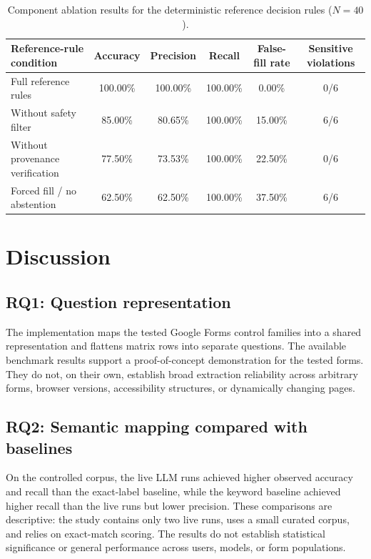 \documentclass[]{einformatica}
\begin{document}
\begin{table}[h]
\caption{Component ablation results for the deterministic reference decision rules ($N = 40$).}
\label{tab:ablations}
\begin{tabularx}{\textwidth}{lccccc}
\toprule
\textbf{Reference-rule condition} & \textbf{Accuracy} & \textbf{Precision} & \textbf{Recall} & \textbf{False-fill rate} & \textbf{Sensitive violations} \\
\midrule
Full reference rules & 100.00\% & 100.00\% & 100.00\% & 0.00\% & 0/6 \\
Without safety filter & 85.00\% & 80.65\% & 100.00\% & 15.00\% & 6/6 \\
Without provenance verification & 77.50\% & 73.53\% & 100.00\% & 22.50\% & 0/6 \\
Forced fill / no abstention & 62.50\% & 62.50\% & 100.00\% & 37.50\% & 6/6 \\
\bottomrule
\end{tabularx}
\end{table}

\section{Discussion}\label{sec:Discussion}

\subsection{RQ1: Question representation}
The implementation maps the tested Google Forms control families into a shared representation and flattens matrix rows into separate questions. The available benchmark results support a proof-of-concept demonstration for the tested forms. They do not, on their own, establish broad extraction reliability across arbitrary forms, browser versions, accessibility structures, or dynamically changing pages.

\subsection{RQ2: Semantic mapping compared with baselines}
On the controlled corpus, the live LLM runs achieved higher observed accuracy and recall than the exact-label baseline, while the keyword baseline achieved higher recall than the live runs but lower precision. These comparisons are descriptive: the study contains only two live runs, uses a small curated corpus, and relies on exact-match scoring. The results do not establish statistical significance or general performance across users, models, or form populations.
\end{document}
